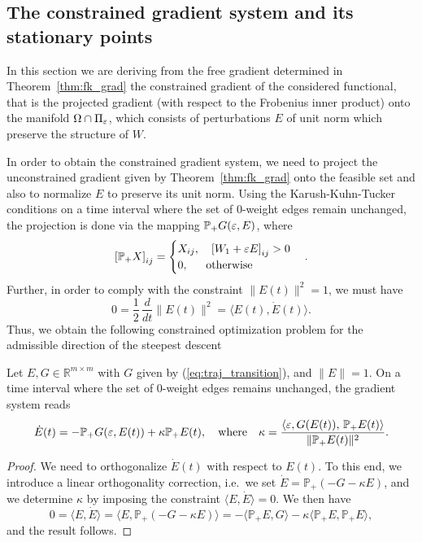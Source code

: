  \subsection{The constrained gradient system and its stationary points}
  \label{subsec:constrained}
  In this section we are deriving from the free gradient determined in  Theorem~\ref{thm:fk_grad} the constrained gradient of the considered functional, that is the projected gradient (with respect to the Frobenius inner product) onto the manifold $\Omega \cap \Pi_\varepsilon$,
  which consists of perturbations $E$ of unit norm which preserve the structure of $W$.
  
  In order to obtain the constrained gradient system, we need to project the unconstrained gradient given by 
  Theorem~\ref{thm:fk_grad} onto the feasible set and also to normalize $E$ to preserve its unit norm. 
  Using the Karush-Kuhn-Tucker conditions on a time interval where the set of $0$-weight edges remain unchanged, the projection is done via the mapping $\mathbb{P}_{+} G( \varepsilon, E )$, where
  \[
  \left[\mathbb{P}_+ X \right]_{ij}=\begin{cases} X_{ij}, \quad \left[ W_1 + \varepsilon E \right]_{ij}>0 \\ 0, \;\;\quad \text{otherwise} \end{cases}.
  \]
  Further, in order to comply with the constraint ${\| E(t) \|^2 =1}$, we must have 
  \begin{equation} \label{eq:normconstr}
   0 = \frac12\,\frac d{dt}\| E(t) \|^2= \langle E(t), \dot E(t) \rangle.
  \end{equation}
  Thus, we obtain the following constrained optimization problem for the admissible direction of the steepest descent
  
  \begin{lemma}
  \label{lem:opt} 
  Let $E,G\in{\mathbb R}^{m \times m}$ with $G$ given by (\ref{eq:traj_transition}), and 
  ${\|E\|=1}$. On a time interval where the set of $0$-weight edges remains unchanged, 
  the gradient system  reads
  \begin{equation}
    \label{eq:traj_proj}
    \dot{E}(t)=-\mathbb{P}_+ G( \varepsilon, E(t) )+ \kappa  \mathbb{P}_+E(t), \quad \text{where} \quad 
    \kappa = \frac{\left\langle { \varepsilon, G(E(t) ),\, \mathbb{P}_+E(t)} \right\rangle}{  \lVert\mathbb{P}_+E(t)\rVert^2}.
   \end{equation}
  \end{lemma}
  \begin{proof}
  We need to orthogonalize $\dot{E}(t)$ with respect to $E(t)$. To this end, we introduce a linear orthogonality correction, i.e.\ we set  
  $\dot E = \mathbb{P}_+ (-G - \kappa E)$, 
  {and we determine} $\kappa$ {by imposing the} constraint $\langle E,\dot E \rangle =0$. We then have
  \[
  0=\langle E,\dot E \rangle = \langle E,\mathbb{P}_+ (-G - \kappa E) \rangle=
  - \langle \mathbb{P}_+  E,G \rangle -  \kappa\langle \mathbb{P}_+  E,\mathbb{P}_+  E \rangle,
  \]
  and the result follows.
  \end{proof}	
    
